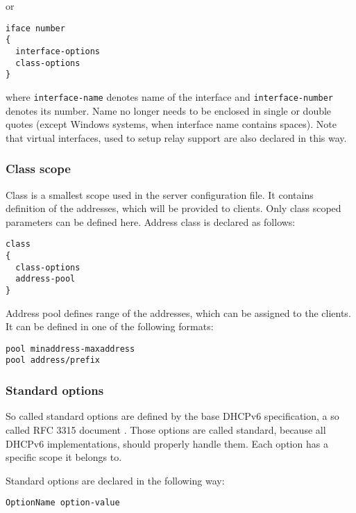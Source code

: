 or

\begin{verbatim}
iface number
{
  interface-options
  class-options
}
\end{verbatim}

where \verb+interface-name+ denotes name of the interface and
\verb+interface-number+ denotes its number. Name no longer needs to be
enclosed in single or double quotes (except Windows systems, when
interface name contains spaces). Note that virtual interfaces, used
to setup relay support are also declared in this way.

\subsubsection{Class scope}
Class is a smallest scope used in the server configuration file. It
contains definition of the addresses, which will be provided to
clients. Only class scoped parameters can be defined here. Address class
is declared as follows:
\begin{verbatim}
class
{
  class-options
  address-pool
}
\end{verbatim}

Address pool defines range of the addresses, which can be assigned to the
clients. It can be defined in one of the following formats:
\begin{verbatim}
pool minaddress-maxaddress
pool address/prefix
\end{verbatim}

\subsubsection{Standard options}

So called standard options are defined by the base DHCPv6 specification,
a so called RFC 3315 document \cite{rfc3315}. Those options are
called standard, because all DHCPv6 implementations, should properly
handle them. Each option has a specific scope it belongs to.

Standard options are declared in the following way:

\begin{verbatim}
OptionName option-value
\end{verbatim}

